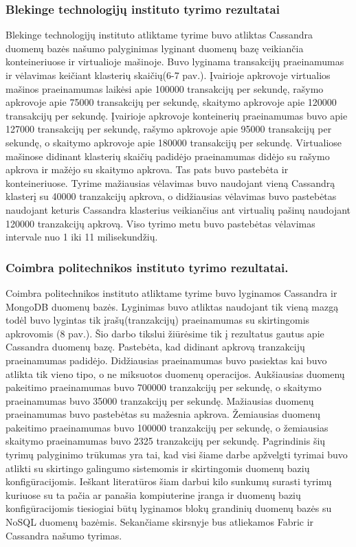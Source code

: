 \documentclass{VUMIFPSkursinis}
\begin{document}
\subsubsection{Blekinge technologijų instituto tyrimo rezultatai}
Blekinge technologijų instituto atliktame tyrime \cite{BITCass} buvo atliktas Cassandra duomenų bazės našumo palyginimas lyginant duomenų bazę veikiančia konteineriuose ir virtualioje mašinoje. Buvo lyginama transakcijų praeinamumas ir vėlavimas keičiant klasterių skaičių(6-7 pav.). Įvairioje apkrovoje virtualios mašinos praeinamumas laikėsi apie 100000 transakcijų per sekundę, rašymo apkrovoje apie 75000 transakcijų per sekundę, skaitymo apkrovoje apie 120000 transakcijų per sekundę.
Įvairioje apkrovoje konteinerių praeinamumas buvo apie 127000 transakcijų per sekundę, rašymo apkrovoje apie 95000 transakcijų per sekundę, o skaitymo apkrovoje apie 180000 transakcijų per sekundę. Virtualiose mašinose didinant klasterių skaičių padidėjo praeinamumas didėjo su rašymo apkrova ir mažėjo su skaitymo apkrova. Tas pats buvo pastebėta ir konteineriuose.
\newline
Tyrime mažiausias vėlavimas buvo naudojant vieną Cassandrą klasterį su 40000 tranzakcijų apkrova, o didžiausias vėlavimas buvo pastebėtas naudojant keturis Cassandra klasterius veikiančius ant virtualių pašinų naudojant 120000 tranzakcijų apkrovą. 
Viso tyrimo metu buvo pastebėtas vėlavimas intervale nuo 1 iki 11 milisekundžių.
\subsubsection{Coimbra politechnikos instituto tyrimo rezultatai.}
Coimbra politechnikos instituto atliktame tyrime \cite{MonCas} buvo lyginamos Cassandra ir MongoDB duomenų bazės. 
Lyginimas buvo atliktas naudojant tik vieną mazgą todėl buvo lygintas tik įrašų(tranzakcijų) praeinamumas su skirtingomis apkrovomis (8 pav.). 
Šio darbo tikslui žiūrėsime tik į rezultatus gautus apie Cassandra duomenų bazę. Pastebėta, kad didinant apkrovą tranzakcijų praeinamumas padidėjo. 
Didžiausias praeinamumas buvo pasiektas kai buvo atlikta tik vieno tipo, o ne miksuotos duomenų operacijos.
Aukšiausias duomenų pakeitimo praeinamumas buvo 700000 tranzakcijų per sekundę, o skaitymo praeinamumas buvo 35000 tranzakcijų per sekundę.
Mažiausias duomenų praeinamumas buvo pastebėtas su mažesnia apkrova.
Žemiausias duomenų pakeitimo praeinamumas buvo 100000 tranzakcijų per sekundę, o žemiausias skaitymo praeinamumas buvo 2325 tranzakcijų per sekundę.
\newline
Pagrindinis šių tyrimų palyginimo trūkumas yra tai, kad visi šiame darbe apžvelgti tyrimai buvo atlikti su skirtingo galingumo sistemomis ir skirtingomis duomenų bazių konfigūracijomis. 
Ieškant literatūros šiam darbui kilo sunkumų surasti tyrimų kuriuose su ta pačia ar panašia kompiuterine įranga ir duomenų bazių konfigūracijomis tiesiogiai būtų lyginamos blokų grandinių duomenų bazės su NoSQL duomenų bazėmis. Sekančiame skirsnyje bus atliekamos Fabric ir Cassandra našumo tyrimas.
\end{document}
